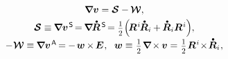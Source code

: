 \nopagebreak\begin{equation}
\begin{array}{c}
\boldnabla \bm{v} = \strainratetensor - \hspace{-0.1ex} \vorticitytensor
,
\\[.333em]
%
\strainratetensor \equiv \hspace{-0.12ex} \boldnabla {\bm{v}}^{\hspace{.2ex}\mathsf{S}} \hspace{-0.32ex}
=  \hspace{-0.2ex} \boldnabla \hspace{-0.16ex} \mathdotabove{\bm{R}}^{\hspace{.3ex}\mathsf{S}} \hspace{-0.32ex}
= \smalldisplaystyleonehalf \hspace{-0.33ex} \left( \hspace{-0.3ex} \bm{R}^{\hspace{.1ex}i} \hspace{-0.2ex} \mathdotabove{\bm{R}}_i \hspace{-0.1ex} + \hspace{-0.1ex} \mathdotabove{\bm{R}}_i \bm{R}^{\hspace{.1ex}i} \right)
\hspace{-0.44ex} ,
\\[.44em]
%
- \hspace{.1ex} \vorticitytensor \equiv \hspace{-0.12ex} \boldnabla {\bm{v}}^{\hspace{.2ex}\mathsf{A}} \hspace{-0.25ex}
= \hspace{-0.1ex} - \hspace{.24ex} \vorticityvector \hspace{-0.12ex} \times \hspace{-0.2ex} \bm{E}
\hspace{.1ex} , \hspace{.6em}
\vorticityvector \equiv \hspace{.1ex} \smalldisplaystyleonehalf \hspace{.15ex} \boldnabla \hspace{-0.2ex} \times \hspace{-0.1ex} \bm{v}
= \hspace{.1ex} \smalldisplaystyleonehalf \hspace{.15ex} \bm{R}^{\hspace{.1ex}i} \hspace{-0.4ex}\times\hspace{-0.35ex} \mathdotabove{\bm{R}}_i
\hspace{.1ex} ,
\end{array}
\end{equation}

